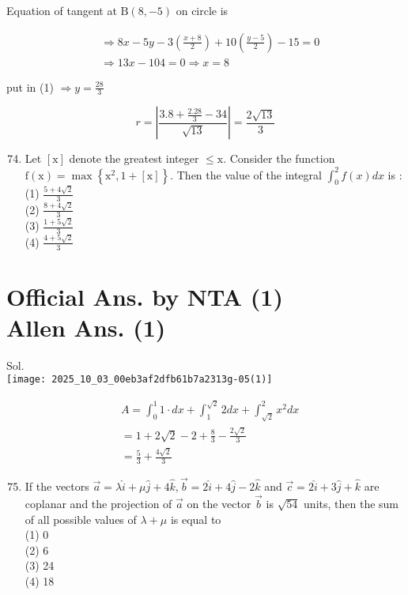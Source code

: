 \documentclass[10pt]{article}
\begin{document}
Equation of tangent at \(\mathrm{B}(8,-5)\) on circle is

\[
\begin{aligned}
& \Rightarrow 8 x-5 y-3\left(\frac{x+8}{2}\right)+10\left(\frac{y-5}{2}\right)-15=0 \\
& \Rightarrow 13 x-104=0 \Rightarrow x=8
\end{aligned}
\]

put in (1) \(\Rightarrow y=\frac{28}{3}\)

\[
r=\left|\frac{3.8+\frac{2.28}{3}-34}{\sqrt{13}}\right|=\frac{2 \sqrt{13}}{3}
\]

\begin{enumerate}
  \setcounter{enumi}{73}
  \item Let \([\mathrm{x}]\) denote the greatest integer \(\leq \mathrm{x}\). Consider the function \(\mathrm{f}(\mathrm{x})=\max \left\{\mathrm{x}^{2}, 1+[\mathrm{x}]\right\}\). Then the value of the integral \(\int_{0}^{2} f(x) d x\) is :\\
(1) \(\frac{5+4 \sqrt{2}}{3}\)\\
(2) \(\frac{8+4 \sqrt{2}}{3}\)\\
(3) \(\frac{1+5 \sqrt{2}}{3}\)\\
(4) \(\frac{4+5 \sqrt{2}}{3}\)
\end{enumerate}

\section*{Official Ans. by NTA (1) \\
 Allen Ans. (1)}
Sol.\\
\texttt{[image: 2025\_10\_03\_00eb3af2dfb61b7a2313g-05(1)]}

\[
\begin{aligned}
& A=\int_{0}^{1} 1 \cdot d x+\int_{1}^{\sqrt{2}} 2 d x+\int_{\sqrt{2}}^{2} x^{2} d x \\
& =1+2 \sqrt{2}-2+\frac{8}{3}-\frac{2 \sqrt{2}}{3} \\
& =\frac{5}{3}+\frac{4 \sqrt{2}}{3}
\end{aligned}
\]

\begin{enumerate}
  \setcounter{enumi}{74}
  \item If the vectors \(\vec{a}=\lambda \hat{i}+\mu \hat{j}+4 \hat{k}, \vec{b}=2 \hat{i}+4 \hat{j}-2 \hat{k}\) and \(\vec{c}=2 \hat{i}+3 \hat{j}+\hat{k}\) are coplanar and the projection of \(\vec{a}\) on the vector \(\vec{b}\) is \(\sqrt{54}\) units, then the sum of all possible values of \(\lambda+\mu\) is equal to\\
(1) 0\\
(2) 6\\
(3) 24\\
(4) 18
\end{enumerate}
\end{document}
